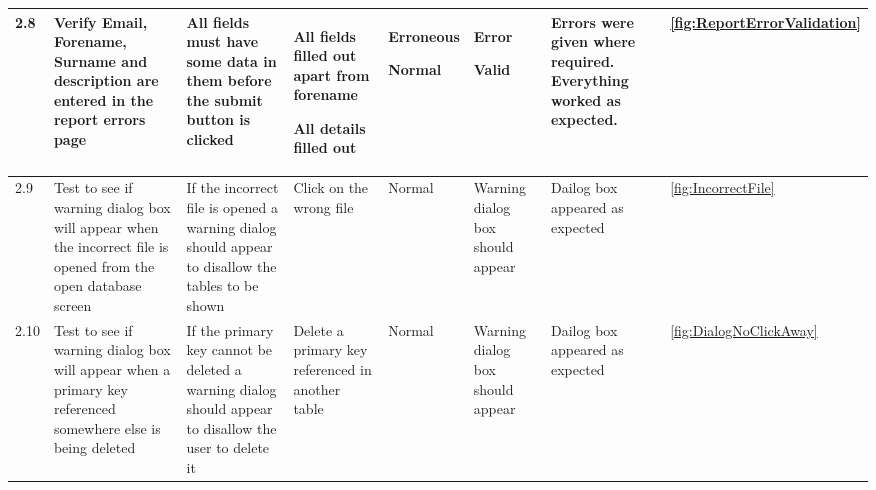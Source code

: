 \begin{landscape}
\begin{center}
\begin{longtable}{|p{1.5cm}|p{2cm}|p{2.5cm}|p{2cm}|p{2cm}|p{2cm}|p{3cm}|p{1.7cm}|}
2.8 & Verify Email, Forename, Surname and description are entered in the report errors page & All fields must have some data in them before the submit  button is clicked & All fields filled out apart from forename \par \bigskip All details filled out & Erroneous \par \bigskip \bigskip Normal & Error \par \bigskip \bigskip Valid &Errors were given where required. Everything worked as expected.&\ref {fig:ReportErrorValidation}  \\ \hline
\rowcolor{lightgray}2.9 & Test to see if warning dialog box will appear when the incorrect file is opened from the open database screen & If the incorrect file is opened a warning dialog should appear to disallow the tables to be shown & Click on the wrong file & Normal &Warning dialog box should appear &Dailog box appeared as expected& \ref {fig:IncorrectFile}  \\ \hline
\rowcolor{lightgray}2.10& Test to see if warning dialog box will appear when a primary key referenced somewhere else is being deleted & If the primary key cannot be deleted a warning dialog should appear to disallow the user to delete it & Delete a primary key referenced in another table & Normal &Warning dialog box should appear &Dailog box appeared as expected& \ref{fig:DialogNoClickAway} \\ \hline



\end{longtable}
\end{center}
\end{landscape}

